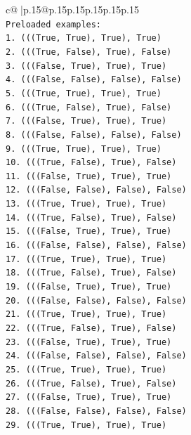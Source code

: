 \documentclass{article}
\begin{document}
{\begin{supertabular}{c@{$\;$}|p{.15\linewidth}@{}p{.15\linewidth}p{.15\linewidth}p{.15\linewidth}p{.15\linewidth}p{.15\linewidth}}
{{{\\ 
\texttt{Preloaded examples:} \\
\texttt{1. (((True, True), True), True)} \\
\texttt{2. (((True, False), True), False)} \\
\texttt{3. (((False, True), True), True)} \\
\texttt{4. (((False, False), False), False)} \\
\texttt{5. (((True, True), True), True)} \\
\texttt{6. (((True, False), True), False)} \\
\texttt{7. (((False, True), True), True)} \\
\texttt{8. (((False, False), False), False)} \\
\texttt{9. (((True, True), True), True)} \\
\texttt{10. (((True, False), True), False)} \\
\texttt{11. (((False, True), True), True)} \\
\texttt{12. (((False, False), False), False)} \\
\texttt{13. (((True, True), True), True)} \\
\texttt{14. (((True, False), True), False)} \\
\texttt{15. (((False, True), True), True)} \\
\texttt{16. (((False, False), False), False)} \\
\texttt{17. (((True, True), True), True)} \\
\texttt{18. (((True, False), True), False)} \\
\texttt{19. (((False, True), True), True)} \\
\texttt{20. (((False, False), False), False)} \\
\texttt{21. (((True, True), True), True)} \\
\texttt{22. (((True, False), True), False)} \\
\texttt{23. (((False, True), True), True)} \\
\texttt{24. (((False, False), False), False)} \\
\texttt{25. (((True, True), True), True)} \\
\texttt{26. (((True, False), True), False)} \\
\texttt{27. (((False, True), True), True)} \\
\texttt{28. (((False, False), False), False)} \\
\texttt{29. (((True, True), True), True)} \\
}}}
\end{supertabular}}
\end{document}
